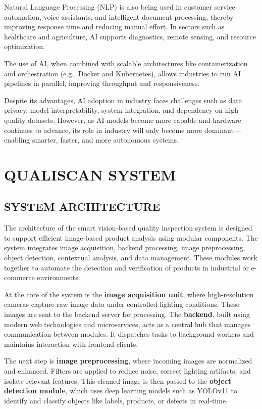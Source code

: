 \documentclass[12pt]{report}
\begin{document}
Natural Language Processing (NLP) is also being used in customer service automation, voice assistants, and intelligent document processing, thereby improving response time and reducing manual effort. In sectors such as healthcare and agriculture, AI supports diagnostics, remote sensing, and resource optimization.

The use of AI, when combined with scalable architectures like containerization and orchestration (e.g., Docker and Kubernetes), allows industries to run AI pipelines in parallel, improving throughput and responsiveness.

Despite its advantages, AI adoption in industry faces challenges such as data privacy, model interpretability, system integration, and dependency on high-quality datasets. However, as AI models become more capable and hardware continues to advance, its role in industry will only become more dominant---enabling smarter, faster, and more autonomous systems.



\newpage
\chapter{QUALISCAN SYSTEM }
\section{SYSTEM ARCHITECTURE}

The architecture of the smart vision-based quality inspection system is designed to support efficient image-based product analysis using modular components. The system integrates image acquisition, backend processing, image preprocessing, object detection, contextual analysis, and data management. These modules work together to automate the detection and verification of products in industrial or e-commerce environments.

At the core of the system is the \textbf{image acquisition unit}, where high-resolution cameras capture raw image data under controlled lighting conditions. These images are sent to the backend server for processing. The \textbf{backend}, built using modern web technologies and microservices, acts as a central hub that manages communication between modules. It dispatches tasks to background workers and maintains interaction with frontend clients.

The next step is \textbf{image preprocessing}, where incoming images are normalized and enhanced. Filters are applied to reduce noise, correct lighting artifacts, and isolate relevant features. This cleaned image is then passed to the \textbf{object detection module}, which uses deep learning models such as YOLOv11 to identify and classify objects like labels, products, or defects in real-time.
\end{document}
